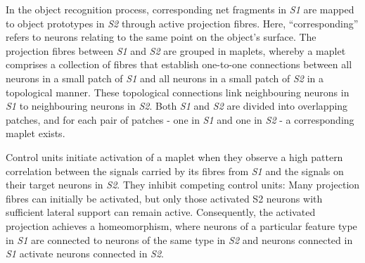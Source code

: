 In the object recognition process, corresponding net fragments in \emph{S1} are mapped to object prototypes in \emph{S2} through active projection fibres. Here, ``corresponding'' refers to neurons relating to the same point on the object's surface.
The projection fibres between \emph{S1} and \emph{S2} are grouped in maplets, whereby a maplet comprises a collection of fibres that establish one-to-one connections between all neurons in a small patch of \emph{S1} and all neurons in a small patch of \emph{S2} in a topological manner. These topological connections link neighbouring neurons in \emph{S1} to neighbouring neurons in \emph{S2}. Both \emph{S1} and \emph{S2} are divided into overlapping patches, and for each pair of patches - one in \emph{S1} and one in \emph{S2} - a corresponding maplet exists.

Control units initiate activation of a maplet when they observe a high pattern correlation between the signals carried by its fibres from \emph{S1} and the signals on their target neurons in \emph{S2}. They inhibit competing control units: Many projection fibres can initially be activated, but only those activated S2 neurons with sufficient lateral support can remain active.
Consequently, the activated projection achieves a homeomorphism, where neurons of a particular feature type in \emph{S1} are connected to neurons of the same type in \emph{S2} and neurons connected in \emph{S1} activate neurons connected in \emph{S2}.

